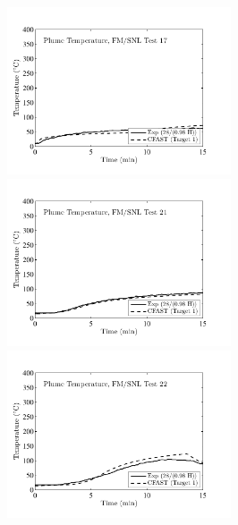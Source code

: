 \begin{figure}[p]
\begin{center}
\includegraphics[width=2.6in]{FIGURES/FM_SNL/FM_SNL_17_Plume_Temperature} \\
\includegraphics[width=2.6in]{FIGURES/FM_SNL/FM_SNL_21_Plume_Temperature} \\
\includegraphics[width=2.6in]{FIGURES/FM_SNL/FM_SNL_22_Plume_Temperature} 
\end{center}
\end{figure}

